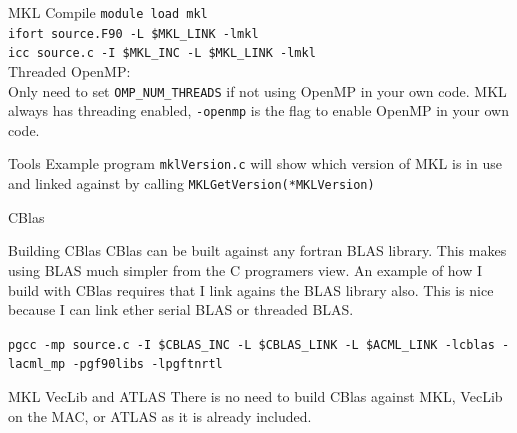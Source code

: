 \documentclass[handout]{beamer}
\begin{document}
\begin{frame}{MKL Compile}
\texttt{module load mkl}            \\
\texttt{ifort source.F90 -L \$MKL\_LINK -lmkl}      \\
\texttt{icc   source.c   -I \$MKL\_INC -L \$MKL\_LINK -lmkl}  \\
Threaded OpenMP:                    \\
Only need to set \texttt{OMP\_NUM\_THREADS} if not using OpenMP in your own code.  MKL always has threading enabled, \texttt{-openmp} is the flag to enable OpenMP in your own code.
\begin{block}{Tools}
Example program \texttt{mklVersion.c} will show which version of MKL is in use and linked against by calling \texttt{MKLGetVersion(*MKLVersion)} \\
\end{block}
\end{frame}
\begin{frame}{CBlas}
\begin{block}{Building CBlas}
 CBlas can be built against any fortran BLAS library. This makes using BLAS much simpler from the C programers view. An example of how I build with CBlas requires that I link agains the BLAS library also.  This is nice because I can link ether serial BLAS or threaded BLAS.
\end{block}
\texttt{pgcc -mp source.c -I \$CBLAS\_INC -L \$CBLAS\_LINK -L \$ACML\_LINK -lcblas -lacml\_mp -pgf90libs -lpgftnrtl}       \\
\begin{block}{MKL VecLib and ATLAS}
There is no need to build CBlas against MKL, VecLib on the MAC, or ATLAS as it is already included.
\end{block}
\end{frame}
\end{document}
